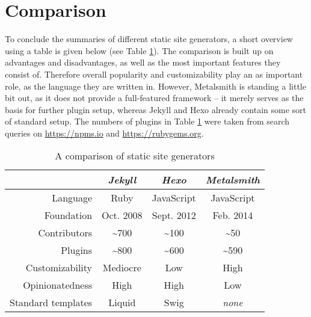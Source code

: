 \section{Comparison}
\label{sec:comparison}

To conclude the summaries of different static site generators, a short overview using a table is given below (see Table \ref{table:comparison}). The comparison is built up on advantages and disadvantages, as well as the most important features they consist of. Therefore overall popularity and customizability play an as important role, as the language they are written in. However, Metalsmith is standing a little bit out, as it does not provide a full-featured framework -- it merely serves as the basis for further plugin setup, whereas Jekyll and Hexo already contain some sort of standard setup.
The numbers of plugins in Table \ref{table:comparison} were taken from search queries on \url{https://npms.io} and \url{https://rubygems.org}.

\begin{table}
  \caption{A comparison of static site generators}
  \label{table:comparison}
  \centering
  \setlength{\tabcolsep}{5mm}
  \def\arraystretch{1.25}
  \begin{tabular}{|r||c|c|c|}
    \hline
    & \emph{Jekyll} & \emph{Hexo} & \emph{Metalsmith} \\
    \hline
    \hline
    Language & Ruby & JavaScript & JavaScript \\
    \hline
    Foundation & Oct. 2008 & Sept. 2012 & Feb. 2014 \\
    \hline
    Contributors & \textasciitilde 700 & \textasciitilde 100 & \textasciitilde 50 \\
    \hline
    Plugins & \textasciitilde 800 & \textasciitilde 600 & \textasciitilde 590 \\
    \hline
    Customizability & Mediocre & Low & High \\
    \hline
    Opinionatedness & High & High & Low \\
    \hline
    Standard templates & Liquid & Swig & \emph{none} \\
    \hline
  \end{tabular}

\end{table}
